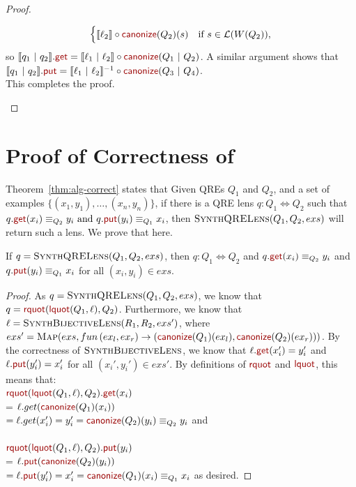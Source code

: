 \documentclass[acmsmall,review,anonymous]{acmart}
\newcommand{\kw}[1]{\textcolor{dkred}{\ensuremath{\mathsf{#1}}}}
\newcommand{\sep}{\ensuremath{\ | \ }}
\newcommand{\canonize}{\ensuremath{\kw{canonize}}}
\newcommand{\get}{\ensuremath{\kw{get}}}
\newcommand{\lput}{\ensuremath{\kw{put}}}
\newcommand{\lquot}{\ensuremath{\kw{lquot}}}
\newcommand{\rquot}{\ensuremath{\kw{rquot}}}
\begin{document}
\begin{proof}
\begin{enumerate}
$$\begin{cases}
\llbracket \ell_2 \rrbracket \circ
\canonize(Q_2) (s) & \text{if } s \in \mathcal{L}(W(Q_2)),\\
\end{cases}$$
so $\llbracket q_1 \sep q_2 \rrbracket.\get = \llbracket \ell_1 \sep
\ell_2 \rrbracket \circ \canonize(Q_1 \sep Q_2)$. A similar argument shows
that $\llbracket q_1 \sep q_2 \rrbracket.\lput = \llbracket \ell_1 \sep
\ell_2 \rrbracket^{-1} \circ \canonize(Q_3 \sep Q_4)$.\\
This completes the proof. 
\end{enumerate}
\end{proof}

\section{Proof of Correctness of }
Theorem~\ref{thm:alg-correct} states that
  Given QREs $Q_1$ and $Q_2$, and a set of examples
  $\{(x_1,y_1),\ldots,(x_n,y_n)\}$, if there is a QRE lens $q : Q_1
  \Leftrightarrow Q_2$ such that $q.\get(x_i) \equiv_{Q_2} y_i \text{ and }
q.\lput(y_i) \equiv_{Q_1} x_i$, then $\textproc{SynthQRELens}(Q_1,Q_2,exs)$ will
return such a lens.  We prove that here.

\begin{lemma}
  If $q = \textproc{SynthQRELens}(Q_1,Q_2,exs)$, then $q : Q_1 \Leftrightarrow
  Q_2$ and $q.\get(x_i) \equiv_{Q_2} y_i$  and 
$q.\lput(y_i) \equiv_{Q_1} x_i$ for all $(x_i,y_i)\in exs$.
\end{lemma}
\begin{proof}
  As $q = \textproc{SynthQRELens}(Q_1,Q_2,exs)$, we know that $q =
  \rquot(\lquot(Q_1, \ell), Q_2)$. Furthermore, we know that $\ell =
  \Call{SynthBijectiveLens}{R_1,R_2,exs'}$, where $exs' = \Call{Map}{exs,fun \,
    (ex_l,ex_r) \to (\canonize(Q_1)(ex_l),\canonize(Q_2)(ex_r))}$. By the correctness of
  $\textproc{SynthBijectiveLens}$, we know that $\ell.\get(x_i') = y_i'$ and
  $\ell.\lput(y_i') = x_i'$ for all $(x_i',y_i')\in exs'$. By definitions of
  $\rquot$ and $\lquot$, this means that:\\
$\rquot(\lquot(Q_1, \ell),
  Q_2).\get(x_i)$\\
 = $\ell.get(\canonize(Q_1)(x_i))$\\ $= \ell.get(x_i') = y_i' =
  \canonize(Q_2)(y_i) \equiv_{Q_2} y_i$ and\\
\\
$\rquot(\lquot(Q_1, \ell),
  Q_2).\lput(y_i)$\\
 = $\ell.\lput(\canonize(Q_2)(y_i))$\\ $= \ell.\lput(y_i') = x_i' =
  \canonize(Q_1)(x_i) \equiv_{Q_1} x_i$ as desired.
\end{proof}
\end{document}
